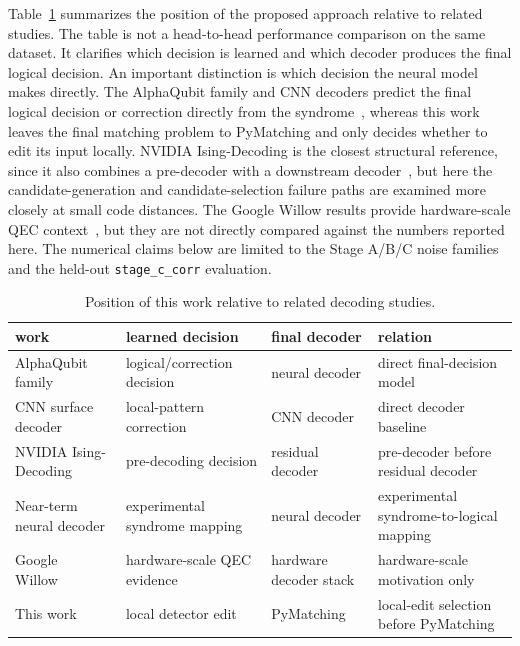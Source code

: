 \documentclass[aps,prd,12pt,twocolumn,superscriptaddress,floatfix,longbibliography]{revtex4-2}
\newcommand{\thesiscaptionfont}{\footnotesize}
\begin{document}
Table~\ref{tab:related-work} summarizes the position of the proposed approach relative to
related studies. The table is not a head-to-head performance comparison on the
same dataset. It clarifies which decision is learned and which decoder produces
the final logical decision. An important distinction is which decision the
neural model makes directly. The AlphaQubit family and CNN decoders predict the
final logical decision or correction directly from the
syndrome~\cite{alphaqubit,alphaqubit2,convnnsurface}, whereas this work leaves
the final matching problem to PyMatching and only decides whether to edit its
input locally. NVIDIA Ising-Decoding is the closest structural reference, since
it also combines a pre-decoder with a downstream decoder~\cite{nvidiaising}, but
here the candidate-generation and candidate-selection failure paths are examined
more closely at small code distances. The Google Willow results provide
hardware-scale QEC context~\cite{willowthreshold}, but they are not directly
compared against the numbers reported here. The numerical claims below are limited to the
Stage A/B/C noise families and the held-out \texttt{stage\_c\_corr} evaluation.

\begin{table}[!tbp]
\caption{\thesiscaptionfont Position of this work relative to related decoding studies.}
\label{tab:related-work}
\centering
\scriptsize
\begin{tabular*}{\textwidth}{@{\extracolsep{\fill}}llll}
\toprule
work & learned decision & final decoder & relation \\
\midrule
AlphaQubit family~\cite{alphaqubit,alphaqubit2} & logical/correction decision & neural decoder & direct final-decision model \\
CNN surface decoder~\cite{convnnsurface} & local-pattern correction & CNN decoder & direct decoder baseline \\
NVIDIA Ising-Decoding~\cite{nvidiaising} & pre-decoding decision & residual decoder & pre-decoder before residual decoder \\
Near-term neural decoder~\cite{neartermnn} & experimental syndrome mapping & neural decoder & experimental syndrome-to-logical mapping \\
Google Willow~\cite{willowthreshold} & hardware-scale QEC evidence & hardware decoder stack & hardware-scale motivation only \\
This work & local detector edit & PyMatching & local-edit selection before PyMatching \\
\bottomrule
\end{tabular*}
\end{table}
\end{document}
